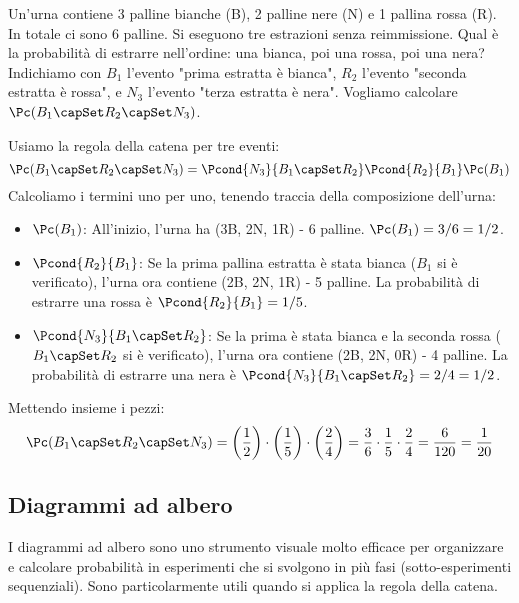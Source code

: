 \begin{example}
Un'urna contiene 3 palline bianche (B), 2 palline nere (N) e 1 pallina rossa (R). In totale ci sono 6 palline. Si eseguono tre estrazioni senza reimmissione.
Qual è la probabilità di estrarre nell'ordine: una bianca, poi una rossa, poi una nera?
Indichiamo con $B_1$ l'evento "prima estratta è bianca", $R_2$ l'evento "seconda estratta è rossa", e $N_3$ l'evento "terza estratta è nera". Vogliamo calcolare $\Pc(B_1 \capSet R_2 \capSet N_3)$.

Usiamo la regola della catena per tre eventi:
\[ \Pc(B_1 \capSet R_2 \capSet N_3) = \Pcond{N_3}{B_1 \capSet R_2} \Pcond{R_2}{B_1} \Pc(B_1) \]
Calcoliamo i termini uno per uno, tenendo traccia della composizione dell'urna:
\begin{itemize}
    \item $\Pc(B_1)$: All'inizio, l'urna ha (3B, 2N, 1R) - 6 palline. $\Pc(B_1) = 3/6 = 1/2$.
    \item $\Pcond{R_2}{B_1}$: Se la prima pallina estratta è stata bianca ($B_1$ si è verificato), l'urna ora contiene (2B, 2N, 1R) - 5 palline. La probabilità di estrarre una rossa è $\Pcond{R_2}{B_1} = 1/5$.
    \item $\Pcond{N_3}{B_1 \capSet R_2}$: Se la prima è stata bianca e la seconda rossa ($B_1 \capSet R_2$ si è verificato), l'urna ora contiene (2B, 2N, 0R) - 4 palline. La probabilità di estrarre una nera è $\Pcond{N_3}{B_1 \capSet R_2} = 2/4 = 1/2$.
\end{itemize}
Mettendo insieme i pezzi:
\[ \Pc(B_1 \capSet R_2 \capSet N_3) = \left(\frac{1}{2}\right) \cdot \left(\frac{1}{5}\right) \cdot \left(\frac{2}{4}\right) = \frac{3}{6} \cdot \frac{1}{5} \cdot \frac{2}{4} = \frac{6}{120} = \frac{1}{20} \]
\end{example}

\subsection{Diagrammi ad albero}
I diagrammi ad albero sono uno strumento visuale molto efficace per organizzare e calcolare probabilità in esperimenti che si svolgono in più fasi (sotto-esperimenti sequenziali). Sono particolarmente utili quando si applica la regola della catena.

